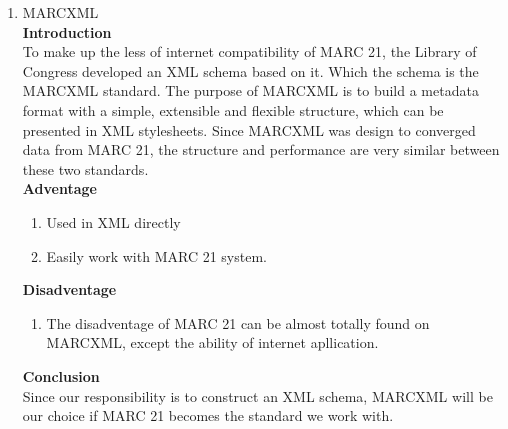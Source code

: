 \begin{enumerate}
	\item MARCXML\\
	{\bf Introduction}\\
	To make up the less of internet compatibility of MARC 21, the Library of Congress developed an XML schema based on it. Which the schema is the MARCXML standard. The purpose of MARCXML is to build a metadata format with a simple, extensible and flexible structure, which can be presented in XML stylesheets. Since MARCXML was design to converged data from MARC 21, the structure and performance are very similar between these two standards.  \\
	{\bf Adventage}
	\begin{enumerate}
		\item Used in XML directly
		\item Easily work with MARC 21 system.
	\end{enumerate}	
	{\bf Disadventage}
	\begin{enumerate}
		\item The disadventage of MARC 21 can be almost totally found on MARCXML, except the ability of internet apllication.
	\end{enumerate}
	{\bf Conclusion}\\
	Since our responsibility is to construct an XML schema, MARCXML will be our choice if MARC 21 becomes the standard we work with.
	

\end{enumerate}
